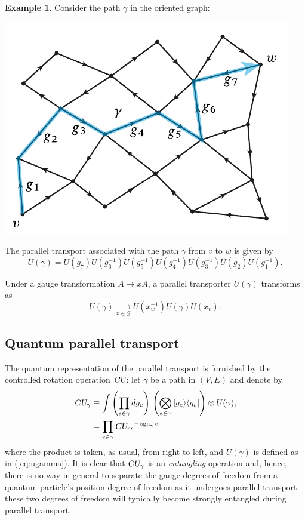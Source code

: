 \documentclass[12pt]{amsart}
\newcommand{\sgn}{\operatorname{sgn}}
\def\CU{\textsl{CU}}
\theoremstyle{definition}
\newtheorem{example}[theorem]{Example}
\theoremstyle{remark}
\numberwithin{equation}{section}
\begin{document}
\begin{example}
Consider the path $\gamma$ in the oriented graph:
\begin{center}
	\includegraphics{paralleltx.pdf}
\end{center}
The parallel transport associated with the path $\gamma$ from $v$ to $w$ is given by
\begin{equation}
	U(\gamma) = U(g_{7})U(g_{6}^{-1})U(g_{5}^{-1})U(g_{4}^{-1})U(g_{3}^{-1})U(g_{2}) U(g_{1}^{-1}).
\end{equation}
\end{example}
Under a gauge transformation $A \mapsto xA$, a parallel transporter $U(\gamma)$ transforms as
\begin{equation}
	U(\gamma) \underset{x\in \mathcal{G}}{\longmapsto} U(x_{w}^{-1}) U(\gamma) U(x_{v}).
\end{equation}

\subsection{Quantum parallel transport}
The quantum representation of the parallel transport is furnished by the controlled rotation operation $\CU$: let $\gamma$ be a path in $(V,E)$ and denote by
\begin{equation}
	\begin{split}
		\CU_\gamma &\equiv \int \left(\prod_{e\in \gamma} dg_e\right)\,  \left(\bigotimes_{e\in \gamma} |g_e\rangle\langle g_e|\right) \otimes U(\gamma), \\
		&= \prod_{e\in \gamma} {\CU_{e s}}^{-\sgn_\gamma{e}}
	\end{split}
\end{equation}
where the product is taken, as usual, from right to left, and $U(\gamma)$ is defined as in (\ref{eq:ugamma}). It is clear that $\CU_\gamma$ is an \emph{entangling} operation and, hence, there is no way in general to separate the gauge degrees of freedom from a quantum particle's position degree of freedom as it undergoes parallel transport: these two degrees of freedom will typically become strongly entangled during parallel transport.
\end{document}
